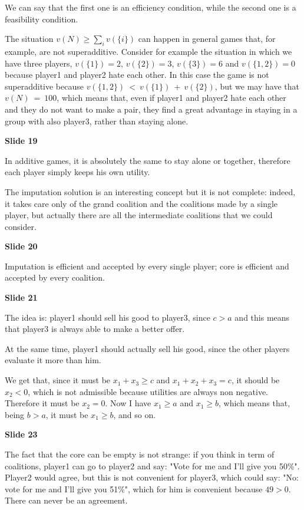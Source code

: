 \noindent We can say that the first one is an efficiency condition, while 
the second one is a feasibility condition.

\noindent The situation $v(N) \geq \sum_i{v(\{i\})}$ can happen in general 
games that, for example, are not superadditive. Consider for example the 
situation in which we have three players, $v(\{1\})=2$, $v(\{2\})=3$, 
$v(\{3\})=6$ and $v(\{1,2\})=0$ because player1 and player2 hate each 
other. In this case the game is not superadditive because 
$v(\{1,2\})~<~v(\{1\})~+~v(\{2\})$, but we may have that $v(N)~=~100$, 
which means that, even if player1 and player2 hate each other and they do 
not want to make a pair, they find a great advantage in staying in a group 
with also player3, rather than staying alone.

\bigskip
\noindent \textbf{Slide 19}

\noindent In additive games, it is absolutely the same to stay alone or 
together, therefore each player simply keeps his own utility.

\noindent The imputation solution is an interesting concept but it is not 
complete: indeed, it takes care only of the grand coalition and the coalitions 
made by a single player, but actually there are all the intermediate 
coalitions that we could consider.

\bigskip
\noindent \textbf{Slide 20} 

\noindent Imputation is efficient and accepted by every single player; core 
is efficient and accepted by every coalition.

\bigskip
\noindent \textbf {Slide 21}

\noindent The idea is: player1 should sell his good to player3, since $c>a$ 
and this means that player3 is always able to make a better offer.

\noindent At the same time, player1 should actually sell his good, since the 
other players evaluate it more than him.

\noindent We get that, since it must be $x_1+x_3\geq c$ and $x_1+x_2+x_3=c$, 
it should be $x_2<0$, which is not admissible because utilities are always 
non negative. Therefore it must be $x_2=0$. Now I have $x_1\geq a$ and 
$x_1 \geq b$, which means that, being $b>a$, it must be $x_1\geq b$, and 
so on.

\bigskip
\noindent \textbf{Slide 23}

\noindent The fact that the core can be empty is not strange: if you think 
in term of coalitions, player1 can go to player2 and say: "Vote for me and 
I'll give you 50\%". Player2 would agree, but this is not convenient for 
player3, which could say: "No: vote for me and I'll give you 51\%", which 
for him is convenient because $49>0$. There can never be an agreement.

%
